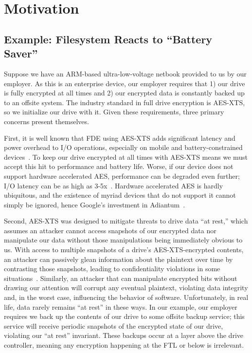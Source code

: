\section{Motivation}\label{sec:motivation}

\subsection{Example: Filesystem Reacts to ``Battery Saver''}

Suppose we have an ARM-based ultra-low-voltage netbook provided to us by our
employer. As this is an enterprise device, our employer requires that 1) our
drive is fully encrypted at all times and 2) our encrypted data is constantly
backed up to an offsite system. The industry standard in full drive encryption
is AES-XTS, so we initialize our drive with it. Given these requirements, three
primary concerns present themselves.

First, it is well known that FDE using AES-XTS adds significant latency and
power overhead to I/O operations, especially on mobile and battery-constrained
devices~\cite{google-engadget, android-M-mobile-motivation,
android-M-mobile-motivation-2}. To keep our drive encrypted at all times with
AES-XTS means we must accept this hit to performance and battery life. Worse, if
our device does not support hardware accelerated AES, performance can be
degraded even further; I/O latency can be as high as 3-5x~\cite{StrongBox}.
Hardware accelerated AES is hardly ubiquitous, and the existence of myriad
devices that do not support it cannot simply be ignored, hence Google's
investment in Adiantum~\cite{Adiantum}.

Second, AES-XTS was designed to mitigate threats to drive data ``at rest,''
which assumes an attacker cannot access snapshots of our encrypted data nor
manipulate our data without those manipulations being immediately obvious to us.
With access to multiple snapshots of a drive's AES-XTS-encrypted contents, an
attacker can passively glean information about the plaintext over time by
contrasting those snapshots, leading to confidentiality violations in some
situations~\cite{XEX, XTS}. Similarly, an attacker that can manipulate encrypted
bits without drawing our attention will corrupt any eventual plaintext,
violating data integrity and, in the worst case, influencing the behavior of
software. Unfortunately, in real life, data rarely remains ``at rest'' in these
ways. In our example, our employer requires we back up the contents of our drive
to some offsite backup service; this service will receive periodic snapshots of
the encrypted state of our drive, violating our ``at rest'' invariant. These
backups occur at a layer above the drive controller, meaning any encryption
happening at the FTL or below is irrelevant.

